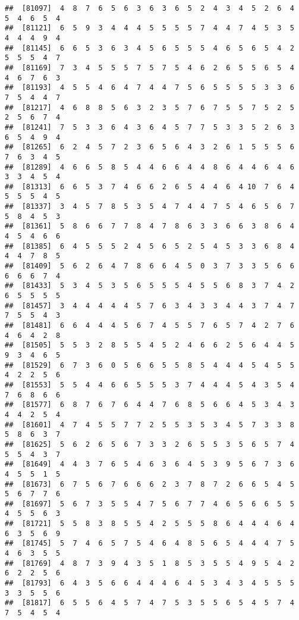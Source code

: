 \documentclass[
]{book}
\begin{document}
\begin{verbatim}
##  [81097]  4  8  7  6  5  6  3  6  3  6  5  2  4  3  4  5  2  6  4  5  4  6  5  4
##  [81121]  6  5  9  3  4  4  4  5  5  5  5  7  4  4  7  4  5  3  5  4  4  4  9  4
##  [81145]  6  6  5  3  6  3  4  5  6  5  5  5  4  6  5  6  5  4  2  5  5  5  4  7
##  [81169]  7  3  4  5  5  5  7  5  7  5  4  6  2  6  5  5  6  5  4  4  6  7  6  3
##  [81193]  4  5  5  4  6  4  7  4  4  7  5  6  5  5  5  5  3  3  6  7  5  4  4  7
##  [81217]  4  6  8  8  5  6  3  2  3  5  7  6  7  5  5  7  5  2  5  2  5  6  7  4
##  [81241]  7  5  3  3  6  4  3  6  4  5  7  7  5  3  3  5  2  6  3  6  5  4  9  4
##  [81265]  6  2  4  5  7  2  3  6  5  6  4  3  2  6  1  5  5  5  6  7  6  3  4  5
##  [81289]  4  6  6  5  8  5  4  4  6  6  4  4  8  6  4  4  6  4  6  3  3  4  5  4
##  [81313]  6  6  5  3  7  4  6  6  2  6  5  4  4  6  4 10  7  6  4  5  5  5  4  5
##  [81337]  3  4  5  7  8  5  3  5  4  7  4  4  7  5  4  6  5  6  7  5  8  4  5  3
##  [81361]  5  8  6  6  7  7  8  4  7  8  6  3  3  6  6  3  8  6  4  4  5  4  6  6
##  [81385]  6  4  5  5  5  2  4  5  6  5  2  5  4  5  3  3  6  8  4  4  4  7  8  5
##  [81409]  5  6  2  6  4  7  8  6  6  4  5  0  3  7  3  3  5  6  6  6  6  6  7  4
##  [81433]  5  3  4  5  3  5  6  5  5  5  4  5  5  6  8  3  7  4  2  6  5  5  5  5
##  [81457]  3  4  4  4  4  4  5  7  6  3  4  3  3  4  4  3  7  4  7  7  5  5  4  3
##  [81481]  6  6  4  4  4  5  6  7  4  5  5  7  6  5  7  4  2  7  6  4  6  4  2  8
##  [81505]  5  5  3  2  8  5  5  4  5  2  4  6  6  2  5  6  4  4  5  9  3  4  6  5
##  [81529]  6  7  3  6  0  5  6  6  5  5  8  5  4  4  4  5  4  5  5  4  2  2  5  6
##  [81553]  5  5  4  4  6  6  5  5  5  3  7  4  4  4  5  4  3  5  4  7  6  8  6  6
##  [81577]  6  8  7  6  7  6  4  4  7  6  8  5  6  6  4  5  3  4  3  4  4  2  5  4
##  [81601]  4  7  4  5  5  7  7  2  5  5  3  5  3  4  5  7  3  3  8  5  8  6  3  7
##  [81625]  5  6  2  6  5  6  7  3  3  2  6  5  5  3  5  6  5  7  4  5  5  4  3  7
##  [81649]  4  4  3  7  6  5  4  6  3  6  4  5  3  9  5  6  7  3  6  4  5  5  1  5
##  [81673]  6  7  5  6  7  6  6  6  2  3  7  8  7  2  6  6  5  4  5  5  6  7  7  6
##  [81697]  5  6  7  3  5  5  4  7  5  6  7  7  4  6  5  6  6  5  5  4  5  5  6  3
##  [81721]  5  5  8  3  8  5  5  4  2  5  5  5  8  6  4  4  4  6  4  6  3  5  6  9
##  [81745]  5  7  4  6  5  7  5  4  6  4  8  5  6  5  4  4  4  7  5  4  6  3  5  5
##  [81769]  4  8  7  3  9  4  3  5  1  8  5  3  5  5  4  9  5  4  2  6  2  2  5  6
##  [81793]  6  4  3  5  6  6  4  4  4  6  4  5  3  4  3  4  5  5  5  3  3  5  5  6
##  [81817]  6  5  5  6  4  5  7  4  7  5  3  5  5  6  5  4  5  7  4  7  5  4  5  4

\end{verbatim}
\end{document}
